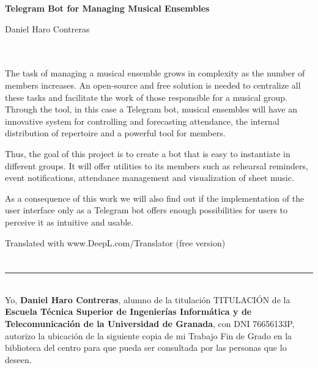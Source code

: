 \cleardoublepage


\thispagestyle{empty}


\begin{center}
{\large\bfseries Telegram Bot for Managing Musical Ensembles}\\
\end{center}
\begin{center}
Daniel Haro Contreras\\
\end{center}

\\

\vspace{0.7cm}
\\

The task of managing a musical ensemble grows in complexity as the number of members increases. An open-source and free solution is needed to centralize all these tasks and facilitate the work of those responsible for a musical group. Through the tool, in this case a Telegram bot, musical ensembles will have an innovative system for controlling and forecasting attendance, the internal distribution of repertoire and a powerful tool for members.

Thus, the goal of this project is to create a bot that is easy to instantiate in different groups. It will offer utilities to its members such as rehearsal reminders, event notifications, attendance management and visualization of sheet music.

As a consequence of this work we will also find out if the implementation of the user interface only as a Telegram bot offers enough possibilities for users to perceive it as intuitive and usable.

Translated with www.DeepL.com/Translator (free version)

\chapter*{}
\thispagestyle{empty}

\noindent\rule[-1ex]{\textwidth}{2pt}\\[4.5ex]

Yo, \textbf{Daniel Haro Contreras}, alumno de la titulación TITULACIÓN de la \textbf{Escuela Técnica Superior
de Ingenierías Informática y de Telecomunicación de la Universidad de Granada}, con DNI 76656133P, autorizo la
ubicación de la siguiente copia de mi Trabajo Fin de Grado en la biblioteca del centro para que pueda ser
consultada por las personas que lo deseen.

